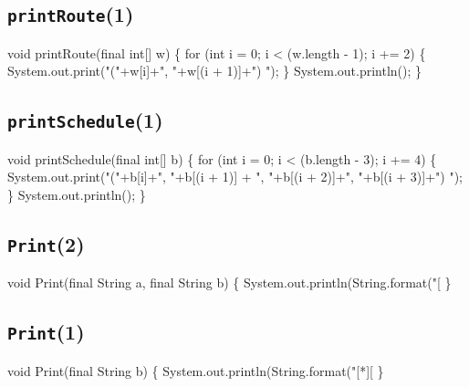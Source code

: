 \subsection{\texttt{printRoute}(1)}
\nwenddocs{}\endmoddef{}
void printRoute(final int[] w) \{
  for (int i = 0; i < (w.length - 1); i += 2) \{
    System.out.print("("+w[i]+", "+w[(i + 1)]+") ");
  \}
  System.out.println();
\}
\eatline
{}\nwendcode{}\nwdocspar
\subsection{\texttt{printSchedule}(1)}
\nwenddocs{}\endmoddef{}
void printSchedule(final int[] b) \{
  for (int i = 0; i < (b.length - 3); i += 4) \{
    System.out.print("("+b[i]+", "+b[(i + 1)]
      + ", "+b[(i + 2)]+", "+b[(i + 3)]+") ");
  \}
  System.out.println();
\}
\eatline
{}\nwendcode{}\nwdocspar

\subsection{\texttt{Print}(2)}
\nwenddocs{}\endmoddef{}
void Print(final String a, final String b) \{
  System.out.println(String.format("[%
\}
\eatline
{}\nwendcode{}\nwdocspar
\subsection{\texttt{Print}(1)}
\nwenddocs{}\endmoddef{}
void Print(final String b) \{
  System.out.println(String.format("[*][%
\}
\nwendcode{}\nwdocspar


